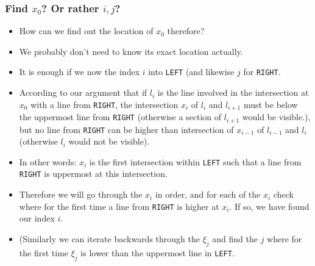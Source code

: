 \documentclass{article}
\begin{document}
\begin{frame}
  \frametitle{Find $x_0$? Or rather $i,j$?}
  \begin{itemize}
  \item How can we find out the location of $x_0$ therefore? 
  \item We probably don't need to know its exact location actually. 
  \item It is enough if we now the index $i$ into \texttt{LEFT} (and likewise $j$
    for \texttt{RIGHT}.
  \item According to our argument that if $l_i$ is the line involved
    in the intersection at $x_0$ with a line from \texttt{RIGHT}, the
    intersection $x_i$ of $l_i$ and $l_{i+1}$ must be below the
    uppermost line from \texttt{RIGHT} (otherwise a section of
    $l_{i+1}$ would be visible.), but no line from \texttt{RIGHT} can
    be higher than intersection of $x_{i-1}$  of $l_{i-1}$ and $l_i$
    (otherwise $l_i$ would not be visible).
  \item In other words: $x_i$ is the first intersection within
    \texttt{LEFT} such that a line from \texttt{RIGHT} is uppermost at
    this intersection.
  \item Therefore we will go through the $x_i$ in order, and for each
    of the $x_i$ check where for the first time a line from \texttt{RIGHT} is higher at
    $x_i$. If so, we have found our index $i$.
  \item (Similarly we can iterate backwards through the $\xi_j$ and
    find the $j$ where for the first time $\xi_j$ is lower than the
    uppermost line in \texttt{LEFT}.
  \end{itemize}
\end{frame}
\end{document}
